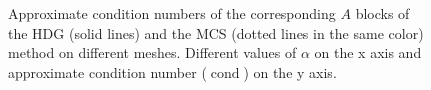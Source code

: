 \begin{figure}
  \resizebox{.8\textwidth}{!} {
    
    }
  \caption{Approximate condition numbers of the corresponding $A$
    blocks of the HDG (solid lines) and the MCS (dotted lines in the
    same color) method on different meshes. Different values of
    $\alpha$ on the x axis and approximate condition number ($\operatorname{cond}$) on the y axis. }
  \label{fig::kappas}
\end{figure}


